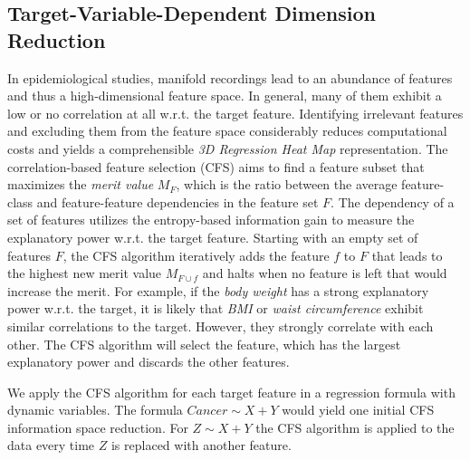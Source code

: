 \documentclass[journal]{style/vgtc} 			          %
\begin{document}
\subsection{Target-Variable-Dependent Dimension Reduction}
In epidemiological studies, manifold recordings lead to an abundance of features and thus a high-dimensional feature space.
In general, many of them exhibit a low or no correlation at all w.r.t. the target feature.
Identifying irrelevant features and excluding them from the feature space considerably reduces computational costs and yields a comprehensible \emph{3D Regression Heat Map} representation.
The correlation-based feature selection (CFS) \cite{CFS} aims to find a feature subset that maximizes the \emph{merit value} $M_F$, which is the ratio between the average feature-class and feature-feature dependencies in the feature set $F$.
The dependency of a set of features utilizes the entropy-based information gain to measure the explanatory power w.r.t. the target feature.
Starting with an empty set of features $F$, the CFS algorithm iteratively adds the feature $f$ to $F$ that leads to the highest new merit value $M_{F\cup f}$ and halts when no feature is left that would increase the merit.
For example, if the \emph{body weight} has a strong explanatory power w.r.t. the target, it is likely that \emph{BMI} or \emph{waist circumference} exhibit similar correlations to the target.
However, they strongly correlate with each other.
The CFS algorithm will select the feature, which has the largest explanatory power and discards the other features.

We apply the CFS algorithm for each target feature in a regression formula with dynamic variables.
The formula $Cancer \sim X + Y$ would yield one initial CFS information space reduction.
For $Z \sim X + Y$ the CFS algorithm is applied to the data every time $Z$ is replaced with another feature.
\end{document}
